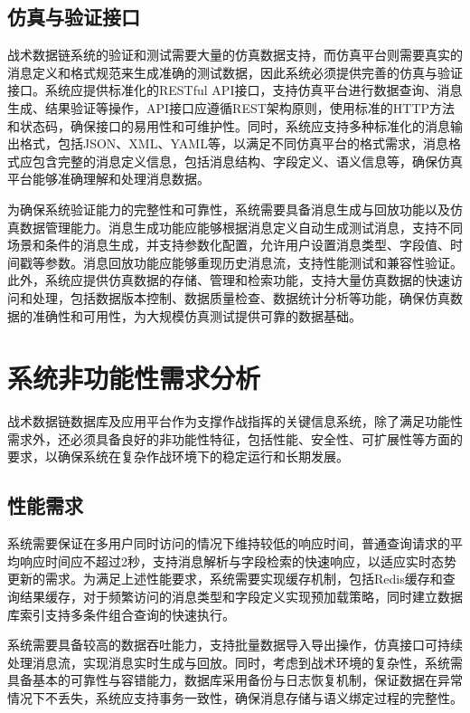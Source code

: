 \subsection{仿真与验证接口}
战术数据链系统的验证和测试需要大量的仿真数据支持，而仿真平台则需要真实的消息定义和格式规范来生成准确的测试数据，因此系统必须提供完善的仿真与验证接口。系统应提供标准化的RESTful API接口，支持仿真平台进行数据查询、消息生成、结果验证等操作，API接口应遵循REST架构原则，使用标准的HTTP方法和状态码，确保接口的易用性和可维护性。同时，系统应支持多种标准化的消息输出格式，包括JSON、XML、YAML等，以满足不同仿真平台的格式需求，消息格式应包含完整的消息定义信息，包括消息结构、字段定义、语义信息等，确保仿真平台能够准确理解和处理消息数据。

为确保系统验证能力的完整性和可靠性，系统需要具备消息生成与回放功能以及仿真数据管理能力。消息生成功能应能够根据消息定义自动生成测试消息，支持不同场景和条件的消息生成，并支持参数化配置，允许用户设置消息类型、字段值、时间戳等参数。消息回放功能应能够重现历史消息流，支持性能测试和兼容性验证。此外，系统应提供仿真数据的存储、管理和检索功能，支持大量仿真数据的快速访问和处理，包括数据版本控制、数据质量检查、数据统计分析等功能，确保仿真数据的准确性和可用性，为大规模仿真测试提供可靠的数据基础\cite{Kao_2008}。
\section{系统非功能性需求分析}

战术数据链数据库及应用平台作为支撑作战指挥的关键信息系统，除了满足功能性需求外，还必须具备良好的非功能性特征，包括性能、安全性、可扩展性等方面的要求，以确保系统在复杂作战环境下的稳定运行和长期发展\cite{Kagioglidis_2009}。

\subsection{性能需求}
系统需要保证在多用户同时访问的情况下维持较低的响应时间，普通查询请求的平均响应时间应不超过2秒，支持消息解析与字段检索的快速响应，以适应实时态势更新的需求\cite{Kee_2008,baek2016_adhoc,baek2019_jsyst_timemirror}。为满足上述性能要求，系统需要实现缓存机制，包括Redis缓存和查询结果缓存，对于频繁访问的消息类型和字段定义实现预加载策略，同时建立数据库索引支持多条件组合查询的快速执行。

系统需要具备较高的数据吞吐能力，支持批量数据导入导出操作，仿真接口可持续处理消息流，实现消息实时生成与回放\cite{lee2018_jsyst,Spyridis_2010,Kopp_Throughput_Enhanced_JTIDS_2006,Juarez_2025}。同时，考虑到战术环境的复杂性，系统需具备基本的可靠性与容错能力，数据库采用备份与日志恢复机制，保证数据在异常情况下不丢失，系统应支持事务一致性，确保消息存储与语义绑定过程的完整性\cite{Koromilas_2009,EverythingRF_STT}。

